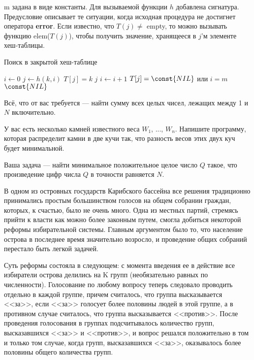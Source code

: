 m задана в виде константы. Для вызываемой функции $h$ добавлена сигнатура. Предусловие описывает те ситуации, когда исходная процедура не достигнет оператора \textbf{error}. Если известно, что $T(j) \neq$ empty, то можно вызывать функцию elem($T(j)$), чтобы получить значение, хранящееся в $j$'м элементе хеш-таблицы.

\z Поиск в закрытой хеш-таблице
\begin{codebox}
\li $i \gets 0$
\li \Repeat $j \gets h(k,i)$
\li \If $T[j] = k$
\li \Then \Return $j$ \End
\li $i \gets i+1$
\li \Until $T[j] = \const{NIL}$ или $i = m$ \End
\li \Return $\const{NIL}$
\end{codebox}



\z Всё, что от вас требуется — найти сумму всех целых чисел, лежащих между 1 и $N$ включительно.

\z У вас есть несколько камней известного веса $W_1$, ..., $W_n$. Напишите программу, которая распределит камни в две кучи так, что разность весов этих двух куч будет минимальной.

\z Ваша задача — найти минимальное положительное целое число $Q$ такое, что произведение цифр числа $Q$ в точности равняется $N$.

\z В одном из островных государств Карибского бассейна все решения традиционно принимались простым большинством голосов на общем собрании граждан, которых, к счастью, было не очень много. Одна из местных партий, стремясь прийти к власти как можно более законным путем, смогла добиться некоторой реформы избирательной системы. Главным аргументом было то, что население острова в последнее время значительно возросло, и проведение общих собраний перестало быть легкой задачей.

Суть реформы состояла в следующем: с момента введения ее в действие все избиратели острова делились на K групп (необязательно равных по численности). Голосование по любому вопросу теперь следовало проводить отдельно в каждой группе, причем считалось, что группа высказывается <<за>>, если <<за>> голосует более половины людей в этой группе, а в противном случае считалось, что группа высказывается <<против>>. После проведения голосования в группах подсчитывалось количество групп, высказавшихся <<за>> и <<против>>, и вопрос решался положительно в том и только том случае, когда групп, высказавшихся <<за>>, оказывалось более половины общего количества групп.


